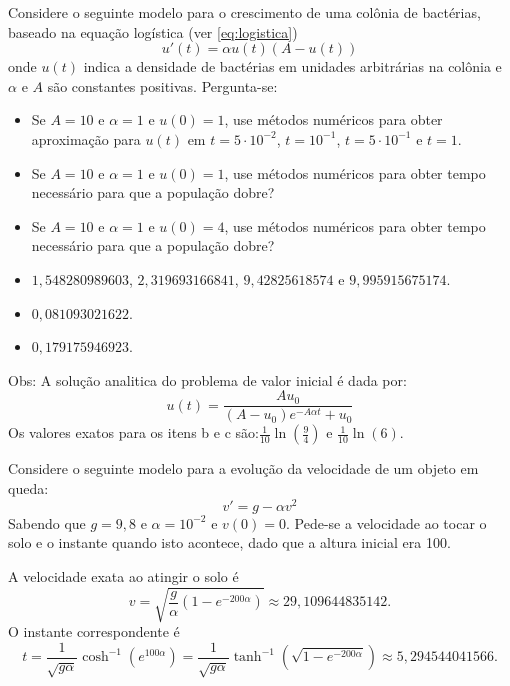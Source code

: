\begin{exer} Considere o seguinte modelo para o crescimento de uma colônia de bactérias, baseado na equação logística (ver \eqref{eq:logistica})
\begin{equation} u'(t)=\alpha u(t) \left(A-u(t)\right) \end{equation}
onde $u(t)$ indica a densidade de bactérias em unidades arbitrárias na colônia e $\alpha$ e $A$ são constantes positivas.
Pergunta-se: %
\begin{itemize}
\item[a)] Se $A=10$ e $\alpha=1$ e $u(0)=1$, use métodos numéricos para obter aproximação para $u(t)$ em $t=5\cdot 10^{-2}$, $t=10^{-1}$, $t=5\cdot 10^{-1}$ e $t=1$.
\item[b)] Se $A=10$ e $\alpha=1$ e $u(0)=1$, use métodos numéricos para obter tempo necessário para que a população dobre?
\item[c)] Se $A=10$ e $\alpha=1$ e $u(0)=4$, use métodos numéricos para obter tempo necessário para que a população dobre?
\end{itemize}
\end{exer}
\begin{resp}
\begin{itemize}
 \item [a)] $1,548280989603$,   $2,319693166841$,    $9,42825618574$ e  $9,995915675174$.
 \item [b)] $0,081093021622$.
 \item [c)] $0,179175946923$.
 \end{itemize}

Obs: A solução analitica do problema de valor inicial é dada por:
 \begin{equation} u(t)=\frac{Au_0}{(A-u_0)e^{-A\alpha t}+u_0} \end{equation}
 Os valores exatos para os itens b e c são:$\frac{1}{10}\ln\left(\frac{9}{4}\right)$ e $\frac{1}{10}\ln\left(6\right)$.

\end{resp}

\begin{exer} Considere o seguinte modelo para a evolução da velocidade de um objeto em queda:
\begin{equation} v'=g-\alpha v^2 \end{equation}
Sabendo que $g=9,8$ e $\alpha=10^{-2}$ e $v(0)=0$. Pede-se a velocidade ao tocar o solo e o instante quando isto acontece, dado que a altura inicial era 100.
\end{exer}
\begin{resp}
A velocidade exata ao atingir o solo é
\begin{equation}
v=\sqrt{\frac{g}{\alpha}\left(1-e^{-200\alpha}\right)}
\approx29,109644835142.
\end{equation}
O instante correspondente é
\begin{equation}
t=\frac{1}{\sqrt{g\alpha}}\cosh^{-1}\left(e^{100\alpha}\right)
=\frac{1}{\sqrt{g\alpha}}\tanh^{-1}\left(\sqrt{1-e^{-200\alpha}}\right)
\approx5,294544041566.
\end{equation}
\end{resp}



